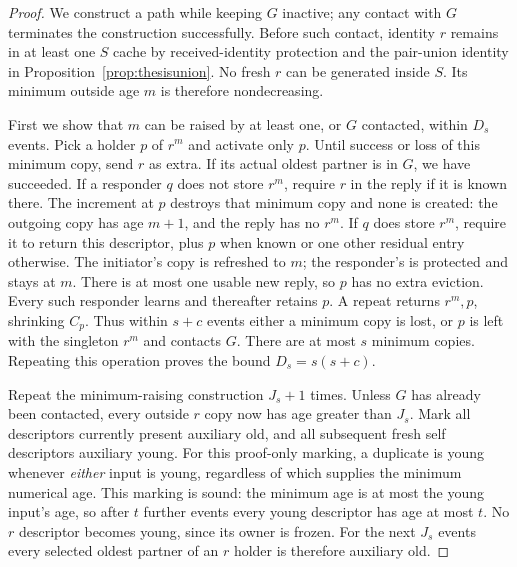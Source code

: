 \documentclass[11pt]{article}
\begin{document}
\begin{proof}
We construct a path while keeping $G$ inactive; any
contact with $G$ terminates the construction successfully.
Before such contact, identity $r$ remains in at least one
$S$ cache by received-identity protection and the pair-union
identity in Proposition~\ref{prop:thesisunion}.
No fresh $r$ can be generated inside $S$.
Its minimum outside age $m$ is therefore nondecreasing.

First we show that $m$ can be raised by at least one,
or $G$ contacted, within $D_s$ events. Pick a holder $p$
of $r^m$ and activate only $p$. Until success or loss of
this minimum copy, send $r$ as extra. If its actual oldest
partner is in $G$, we have succeeded. If a responder $q$
does not store $r^m$, require $r$ in the reply if it is
known there. The increment at $p$ destroys that
minimum copy and none is created: the outgoing copy has
age $m+1$, and the reply has no $r^m$.
If $q$ does store $r^m$, require it to return this
descriptor, plus $p$ when known or one other residual
entry otherwise. The initiator's copy is refreshed to $m$;
the responder's is protected and stays at $m$.
There is at most one usable new reply, so $p$ has no
extra eviction. Every such responder learns and thereafter
retains $p$. A repeat returns $r^m,p$, shrinking $C_p$.
Thus within $s+c$ events either a minimum copy is lost,
or $p$ is left with the singleton $r^m$ and contacts $G$.
There are at most $s$ minimum copies. Repeating this
operation proves the bound $D_s=s(s+c)$.

Repeat the minimum-raising construction $J_s+1$ times.
Unless $G$ has already been contacted, every outside
$r$ copy now has age greater than $J_s$.
Mark all descriptors currently present auxiliary old,
and all subsequent fresh self descriptors auxiliary young.
For this proof-only marking, a duplicate is young whenever
\emph{either} input is young, regardless of which supplies
the minimum numerical age. This marking is sound: the
minimum age is at most the young input's age, so after
$t$ further events every young descriptor has age at most
$t$. No $r$ descriptor becomes young, since its owner is
frozen. For the next $J_s$ events every selected oldest
partner of an $r$ holder is therefore auxiliary old.


\end{proof}
\end{document}
